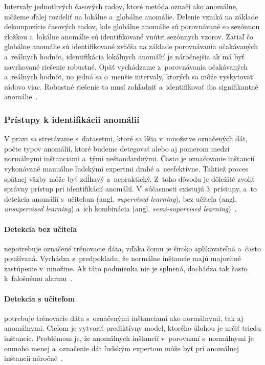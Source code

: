 \documentclass[a4paper,twoside,slovak,12pt,appendix]{article}
\begin{document}
Intervaly jednotlivých časových radov, ktoré metóda označí ako anomálne, môžeme
ďalej rozdeliť na lokálne a~globálne anomálie. Delenie vzniká na základe
dekompozície časových radov, kde globálne anomálie sú porovnávané so
sezónnou zložkou a~lokálne anomálie sú identifikované vnútri sezónnych vzorov.
Zatiaľ čo globálne anomálie sú identifikované zväčša na základe porovnávania
očakávaných a~reálnych hodnôt, identifikácia lokálnych anomálií je náročnejšia
ak má byť navrhované riešenie robustné. Opäť vychádzame z~porovnávania
očakávaných a~reálnych hodnôt, no jedná sa o~menšie intervaly, ktorých sa môže
vyskytovať rádovo viac. Robustné riešenie to musí zohľadniť a~identifikovať iba
signifikantné anomálie~\cite{Kejariwal2015}.


\subsubsection{Prístupy k identifikácii anomálií}
V praxi sa stretávame s~datasetmi, ktoré sa líšia v~množstve označených dát,
počte typov anomálií, ktoré budeme detegovať alebo aj pomerom medzi normálnymi
inštanciami a~tými neštandardnými. Často je označovanie inštancií vykonávané
manuálne ľudskými expertmi drahé a~neefektívne. Taktiež proces spätnej väzby
môže byť zdĺhavý a~nepraktický. Z~toho dôvodu je dôležité zvoliť správny
prístup pri identifikácií anomálií. V~súčasnosti existujú 3~prístupy, a~to
detekcia anomálií s~učiteľom (angl. \textit{supervised learning}), bez učiteľa
(angl. \textit{unsupervised learning}) a~ich kombinácia (angl.
\textit{semi-supervised learning})~\cite{Chandola2009}.

\paragraph{Detekcia bez učiteľa} nepotrebuje označené trénovacie dáta, vďaka
čomu je široko aplikovateľná a~často používaná. Vychádza z~predpokladu, že
normálne inštancie majú majoritné zastúpenie v~množine. Ak táto podmienka nie je
splnená, dochádza tak často k~falošnému alarmu~\cite{Chandola2009}.

\paragraph{Detekcia s učiteľom} potrebuje trénovacie dáta s~označenými
inštanciami ako normálnymi, tak aj anomálnymi. Cieľom je vytvoriť prediktívny
model, ktorého úlohou je určiť triedu inštancie. Problémom je, že anomálnych
inštancií v~porovnaní s~normálnymi je omnoho menej a~označenie dát ľudským
expertom môže byť pri anomálnej inštancií náročné~\cite{Chandola2009}.
\end{document}
